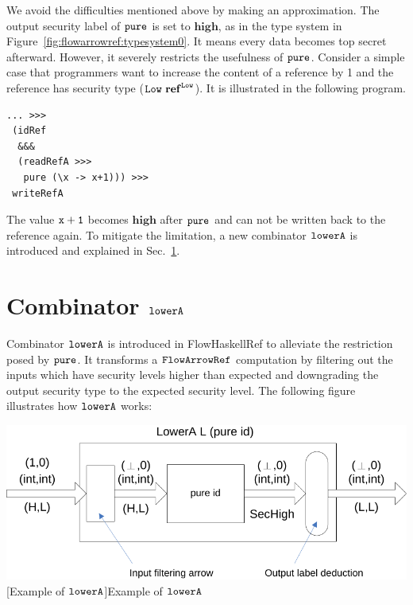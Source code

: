 \documentclass[a4paper]{report}
\newcommand{\co}[1]{$\cod{#1}$}
\begin{document}
We avoid the difficulties mentioned above by making an approximation.
The output security label of \co{pure} is set to $\mathbf{high}$, as in the type system in 
Figure~\ref{fig:flowarrowref:typesystem0}.
It means every data becomes top secret afterward. 
However, it severely restricts the usefulness of \co{pure}. 
Consider a simple case that programmers want to increase the content of a reference by 1 and the reference
has security type ($\mathtt{Low}~\mathbf{ref}^{\mathtt{Low}}$). It is illustrated in the following program.
\begin{Verbatim}[fontsize=\footnotesize]
 ... >>>
 (idRef 
  &&& 
  (readRefA >>>
   pure (\x -> x+1))) >>>
 writeRefA
\end{Verbatim}
The value \co{x+1} becomes $\mathbf{high}$ after \co{pure} and can not be written back to the reference
again. To mitigate the limitation, a new combinator \co{lowerA} is introduced and explained in
Sec.~\ref{chap4:lower}.

\section{Combinator \co{lowerA}}
\label{chap4:lower}


Combinator \co{lowerA} is introduced in FlowHaskellRef to alleviate the restriction posed by \co{pure}. 
It transforms a \co{FlowArrowRef} computation by filtering out the inputs which have security levels higher
than expected and downgrading the output security type to the expected security level.
The following figure illustrates how \co{lowerA} works:

\begin{center}
\includegraphics[scale=0.7]{lower.pdf} \\
[Example of \co{lowerA}]{Example of \co{lowerA}}
\end{center}
\end{document}
